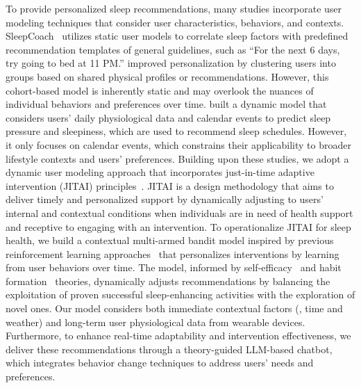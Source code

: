 To provide personalized sleep recommendations, many studies incorporate user modeling techniques that consider user characteristics, behaviors, and contexts.
SleepCoach~\cite{daskalova2016sleepcoacher} utilizes static user models to correlate sleep factors with predefined recommendation templates of general guidelines, such as ``For the next 6 days, try going to bed at 11 PM.'' 
\citet{daskalova2018investigating} improved personalization by clustering users into groups based on shared physical profiles or recommendations.
However, this cohort-based model is inherently static and may overlook the nuances of individual behaviors and preferences over time.
\citet{lee2022sleepguru} built a dynamic model that considers users’ daily physiological data and calendar events to predict sleep pressure and sleepiness, which are used to recommend sleep schedules. However, it only focuses on calendar events, which constrains their applicability to broader lifestyle contexts and users' preferences.
Building upon these studies, we adopt a dynamic user modeling approach that incorporates just-in-time adaptive intervention (JITAI) principles~\cite{nahum2018just}.
JITAI is a design methodology that aims to deliver timely and personalized support by dynamically adjusting to users' internal and contextual conditions when individuals are in need of health support and receptive to engaging with an intervention.
To operationalize JITAI for sleep health, we build a contextual multi-armed bandit model inspired by previous reinforcement learning approaches~\cite{mybehavior,liao2020personalized} that personalizes interventions by learning from user behaviors over time.
The model, informed by self-efficacy~\cite{bandura1977self} and habit formation~\cite{lally2010habits} theories, dynamically adjusts recommendations by balancing the exploitation of proven successful sleep-enhancing activities with the exploration of novel ones.
Our model considers both immediate contextual factors (\eg, time and weather) and long-term user physiological data from wearable devices.
Furthermore, to enhance real-time adaptability and intervention effectiveness, we deliver these recommendations through a theory-guided LLM-based chatbot, which integrates behavior change techniques to address users' needs and preferences.


